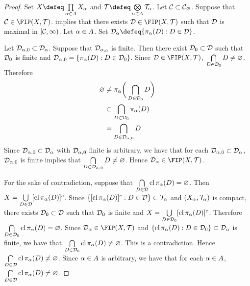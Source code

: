 \documentclass{book}
\begin{document}
	\begin{proof}
		Set $X \defeq \prod\limits_{\al \in A} X_{\al}$ and $\MT \defeq \bigotimes\limits_{\al \in A} \MT_{\al}$. Let $\mathcal{C} \subset \mathcal{C}_{\varnothing}$. Suppose that $\MC \in \FIP(X, \MT)$.  implies that there exists $\MD \in \FIP(X, \MT)$ such that $\mathcal{D}$ is maximal in $[\mathcal{C}, \infty)$. Let $\alpha \in A$. Set $\MD_{\al} \defeq \{\pi_{\al}(D):D \in \MD\}$. 
		
		Let $\mathcal{D}_{\alpha, 0} \subset \mathcal{D}_{\alpha}$. Suppose that $\mathcal{D}_{\alpha,_0}$ is finite. Then there exist $\mathcal{D}_0 \subset \mathcal{D}$ such that $\mathcal{D}_0$ is finite and $\mathcal{D}_{\alpha, 0} = \{\pi_{\alpha}(D): D \in \mathcal{D}_0\}$. Since $\MD \in \FIP(X, \MT)$, $\bigcap\limits_{D \in \mathcal{D}_0} D \neq \varnothing$. Therefore 
		\begin{align*}
			\varnothing
			& \neq \pi_{\alpha} \bigg( \bigcap_{D \in \mathcal{D}_0} D \bigg) \\
			& \subset \bigcap_{D \in \mathcal{D}_0} \pi_{\alpha}(D) \\
			& = \bigcap_{D \in \mathcal{D}_{\alpha, 0}} D 
		\end{align*}
		Since $\mathcal{D}_{\alpha, 0} \subset \mathcal{D}_{\alpha}$ with $\mathcal{D}_{\alpha, 0}$ finite is arbitrary, we have that for each $\mathcal{D}_{\alpha, 0} \subset \mathcal{D}_{\alpha}$, $\mathcal{D}_{\alpha,0}$ is finite implies that $\bigcap\limits_{D \in \mathcal{D}_{\alpha, 0}} D \neq \varnothing$. Hence $\MD_{\al} \in \FIP(X, \MT)$. 
		
		For the sake of contradiction, suppose that $\bigcap\limits_{D \in \mathcal{D}} \operatorname{cl} \pi_{\alpha}(D) = \varnothing$. Then $X = \bigcup\limits_{D \in \mathcal{D}} [ \operatorname{cl} \pi_{\alpha}(D) ]^c $. Since $\{[\operatorname{cl} \pi_{\alpha}(D)]^c:D \in \mathcal{D} \} \subset \mathcal{T}_{\alpha}$ and $(X_{\alpha}, \mathcal{T}_{\alpha})$ is compact, there exists $\mathcal{D}_0 \subset \mathcal{D}$ such that $\mathcal{D}_0$ is finite and $X = \bigcup\limits_{D \in \mathcal{D}_0} [ \operatorname{cl} \pi_{\alpha}(D) ]^c$. Therefore $\bigcap\limits_{D \in \mathcal{D}_0} \operatorname{cl} \pi_{\alpha}(D) = \varnothing$. Since $\MD_{\al} \in \FIP(X, \MT)$ and $\{ \operatorname{cl} \pi_{\alpha}(D): D \in \mathcal{D}_0 \} \subset \mathcal{D}_{\alpha}$ is finite, we have that $\bigcap\limits_{D \in \mathcal{D}_0} \operatorname{cl} \pi_{\alpha}(D) \neq \varnothing$. This is a contradiction. Hence $\bigcap\limits_{D \in \mathcal{D}} \operatorname{cl} \pi_{\alpha}(D) \neq \varnothing$. Since $\alpha \in A$ is arbitrary, we have that for each $\alpha \in A$, $\bigcap\limits_{D \in \mathcal{D}} \operatorname{cl} \pi_{\alpha}(D) \neq \varnothing$.
		

\end{proof}
\end{document}

